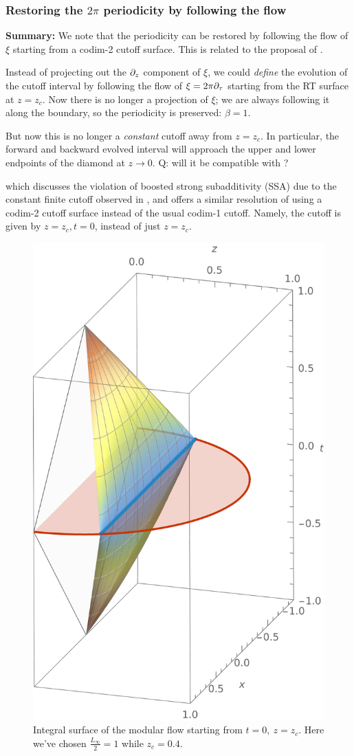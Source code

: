 \documentclass[11pt,a4paper,utf8]{article}
\begin{document}
\pagebreak


\subsubsection{Restoring the $2\pi$ periodicity by following the flow}
	
\textbf{Summary:} We note that the periodicity can be restored by following the flow of $\xi$ starting from a codim-2 cutoff surface. This is related to the proposal of \cite{Grado-White:2020wlb}. 
	
	Instead of projecting out the $\partial_{z}$ component of $\xi$, we could \textit{define} the evolution of the cutoff interval by following the flow of $\xi = 2\pi\partial_{\tau}$ starting from the RT surface at $z = z_c$. Now there is no longer a projection of $\xi$; we are always following it along the boundary, so the periodicity is preserved: $\beta = 1$. 
	
	But now this is no longer a \textit{constant} cutoff away from $z = z_c$. In particular, the forward and backward evolved interval will approach the upper and lower endpoints of the diamond at $z \to 0$. Q: will it be compatible with \textcite{McGough:2016lol}? 
	
	 which discusses the violation of boosted strong subadditivity (SSA) due to the constant finite cutoff observed in \cite{Lewkowycz:2019xse}, and offers a similar resolution of using a codim-2 cutoff surface instead of the usual codim-1 cutoff. Namely, the cutoff is given by $
		z = z_c, t = 0
	$, instead of just $z = z_c$. 
	
	\begin{figure}[!ht]
	\centering
	\includegraphics[width=.35\linewidth]{img/modFlowAnalytic.pdf}
	\caption{Integral surface of the modular flow starting from $t = 0,\ z = z_c$. Here we've chosen $\frac{L_\infty}{2} = 1$ while $z_c = 0.4$.}
	\end{figure}
	
\end{document}
